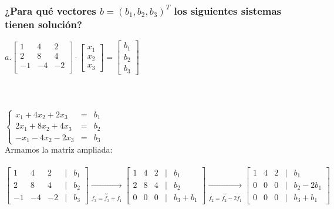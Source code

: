 \documentclass{article}
\begin{document}
\subsubsection{¿Para qué vectores $b = (b_1,b_2,b_3)^T$ los siguientes sistemas tienen solución?}
$
a.
\begin{bmatrix}
1 & 4 & 2 \\
2 & 8 & 4 \\
-1 & -4 & -2 \\
\end{bmatrix} \cdot
\begin{bmatrix}
x_1 \\
x_2 \\
x_3
\end{bmatrix} =
\begin{bmatrix}
b_1 \\
b_2 \\
b_3
\end{bmatrix}$
\\ \\ \\ \\
$
\left\lbrace
\begin{array}{rcl}
x_1 + 4x_2 + 2x_3 & = & b_1 \\
2x_1 + 8x_2 + 4x_3 & = & b_2 \\ 
-x_1 -4x_2 -2x_3 & = & b_3
\end{array}
\right.$ \\
Armamos la matriz ampliada: \\ \\
$
\begin{bmatrix}
1 & 4 & 2 & | & b_1 \\
2 & 8 & 4 & | & b_2 \\
-1 & -4 & -2 & | & b_3 
\end{bmatrix} \underbrace{\longrightarrow}_{f_3 = f_3+f_1}
\begin{bmatrix}
1 & 4 & 2 & | & b_1 \\
2 & 8 & 4 & | & b_2 \\
0 & 0 & 0 & | & b_3+b_1
\end{bmatrix} \underbrace{\longrightarrow}_{f_2 = f_2 - 2f_1}
\begin{bmatrix}
1 & 4 & 2 & | & b_1 \\
0 & 0 & 0 & | & b_2-2b_1 \\
0 & 0 & 0 & | & b_3+b_1
\end{bmatrix}
$
\\ \\ \\
\end{document}
